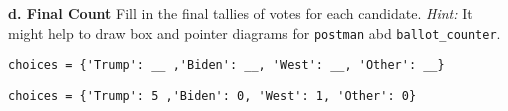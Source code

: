 \begin{blocksection}
\vspace{1\baselineskip}
\textbf{d. Final Count}
Fill in the final tallies of votes for each candidate.
\emph{Hint:} It might help to draw box and pointer diagrams for \lstinline{postman} abd \lstinline{ballot_counter}.
\vspace{1\baselineskip}
\begin{lstlisting}
choices = {'Trump': __ ,'Biden': __, 'West': __, 'Other': __}

\end{lstlisting}
\begin{solution}[1in]
\begin{lstlisting}
choices = {'Trump': 5 ,'Biden': 0, 'West': 1, 'Other': 0}
\end{lstlisting}
\end{solution}

\end{blocksection}

